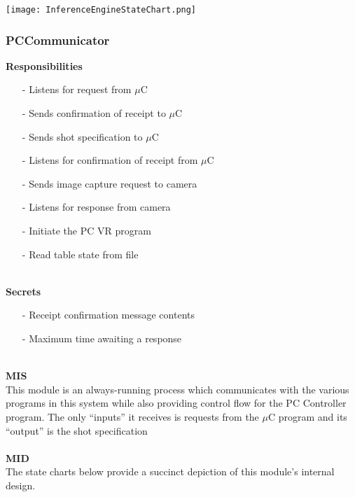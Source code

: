 \documentclass[titlepage]{article}
\begin{document}
\begin{center}
	\texttt{[image: InferenceEngineStateChart.png]}
\label{fig:InferenceEngineStateChart}
\end{center}

\subsubsection{PCCommunicator}
\textbf{Responsibilities}
\begin{itemize}
	\item[-] Listens for request from $\mu$C
	\item[-] Sends confirmation of receipt to $\mu$C
	\item[-] Sends shot specification to $\mu$C
	\item[-] Listens for confirmation of receipt from $\mu$C
	\item[-] Sends image capture request to camera
	\item[-] Listens for response from camera
	\item[-] Initiate the PC VR program
	\item[-] Read table state from file
\end{itemize}~\\
\textbf{Secrets}
\begin{itemize}
	\item[-] Receipt confirmation message contents
	\item[-] Maximum time awaiting a response
\end{itemize}~\\
\textbf{MIS}\\[2mm]
This module is an always-running process which communicates with the various programs in this system while also providing control flow for the PC Controller program. The only ``inputs'' it receives is requests from the $\mu$C program and its ``output'' is the shot specification
\\\\
\textbf{MID}\\[2mm]
The state charts below provide a succinct depiction of this module's internal design.
\\\\
\end{document}
